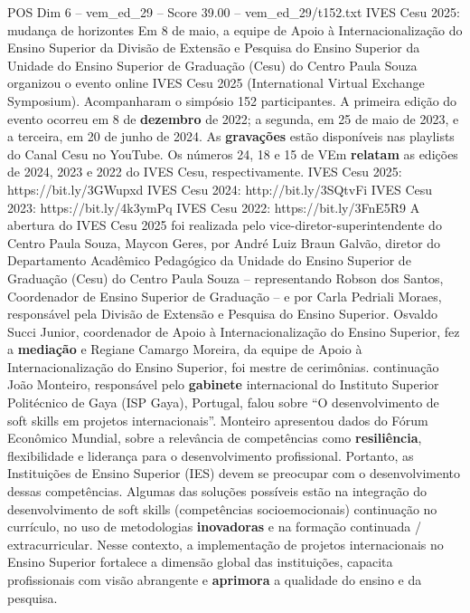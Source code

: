 \begin{textsample}{POS Dim 6 – vem\_ed\_29 – Score 39.00 – vem\_ed\_29/t152.txt}  \label{ex:f6_pos_001}
IVES Cesu 2025: mudança de horizontes Em 8 de maio, a equipe de Apoio à Internacionalização do Ensino Superior da Divisão de Extensão e Pesquisa do Ensino Superior da Unidade do Ensino Superior de Graduação (Cesu) do Centro Paula Souza organizou o evento online IVES Cesu 2025 (International Virtual Exchange Symposium).
Acompanharam o simpósio 152 participantes.
A primeira edição do evento ocorreu em 8 de \textbf{dezembro} de 2022; a segunda, em 25 de maio de 2023, e a terceira, em 20 de junho de 2024.
As \textbf{gravações} estão disponíveis nas playlists do Canal Cesu no YouTube.
Os números 24, 18 e 15 de VEm \textbf{relatam} as edições de 2024, 2023 e 2022 do IVES Cesu, respectivamente.
IVES Cesu 2025: https://bit.ly/3GWupxd IVES Cesu 2024: http://bit.ly/3SQtvFi IVES Cesu 2023: https://bit.ly/4k3ymPq IVES Cesu 2022: https://bit.ly/3FnE5R9 A abertura do IVES Cesu 2025 foi realizada pelo vice-diretor-superintendente do Centro Paula Souza, Maycon Geres, por André Luiz Braun Galvão, diretor do Departamento Acadêmico Pedagógico da Unidade do Ensino Superior de Graduação (Cesu) do Centro Paula Souza – representando Robson dos Santos, Coordenador de Ensino Superior de Graduação – e por Carla Pedriali Moraes, responsável pela Divisão de Extensão e Pesquisa do Ensino Superior.
Osvaldo Succi Junior, coordenador de Apoio à Internacionalização do Ensino Superior, fez a \textbf{mediação} e Regiane Camargo Moreira, da equipe de Apoio à Internacionalização do Ensino Superior, foi mestre de cerimônias. continuação João Monteiro, responsável pelo \textbf{gabinete} internacional do Instituto Superior Politécnico de Gaya (ISP Gaya), Portugal, falou sobre “O desenvolvimento de soft skills em projetos internacionais”.
Monteiro apresentou dados do Fórum Econômico Mundial, sobre a relevância de competências como \textbf{resiliência}, flexibilidade e liderança para o desenvolvimento profissional.
Portanto, as Instituições de Ensino Superior (IES) devem se preocupar com o desenvolvimento dessas competências.
Algumas das soluções possíveis estão na integração do desenvolvimento de soft skills (competências socioemocionais) continuação no currículo, no uso de metodologias \textbf{inovadoras} e na formação continuada / extracurricular.
Nesse contexto, a implementação de projetos internacionais no Ensino Superior fortalece a dimensão global das instituições, capacita profissionais com visão abrangente e \textbf{aprimora} a qualidade do ensino e da pesquisa.

\end{textsample}
